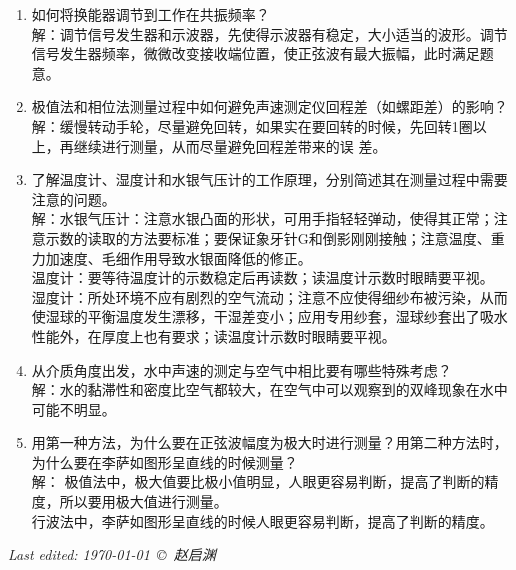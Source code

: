 \documentclass[a4paper,11pt]{article}
\begin{document}
\begin{enumerate}
	\item 如何将换能器调节到工作在共振频率？\\
	解：调节信号发生器和示波器，先使得示波器有稳定，大小适当的波形。调节信号发生器频率，微微改变接收端位置，使正弦波有最大振幅，此时满足题意。
	\item 极值法和相位法测量过程中如何避免声速测定仪回程差（如螺距差）的影响？\\
	解：缓慢转动手轮，尽量避免回转，如果实在要回转的时候，先回转1圈以上，再继续进行测量，从而尽量避免回程差带来的误
	差。
	\item 了解温度计、湿度计和水银气压计的工作原理，分别简述其在测量过程中需要注意的问题。\\
	解：水银气压计：注意水银凸面的形状，可用手指轻轻弹动，使得其正常；注意示数的读取的方法要标准；要保证象牙针G和倒影刚刚接触；注意温度、重力加速度、毛细作用导致水银面降低的修正。\\
	温度计：要等待温度计的示数稳定后再读数；读温度计示数时眼睛要平视。\\
	湿度计：所处环境不应有剧烈的空气流动；注意不应使得细纱布被污染，从而使湿球的平衡温度发生漂移，干湿差变小；应用专用纱套，湿球纱套出了吸水性能外，在厚度上也有要求；读温度计示数时眼睛要平视。
	\item 从介质角度出发，水中声速的测定与空气中相比要有哪些特殊考虑？\\
	解：水的黏滞性和密度比空气都较大，在空气中可以观察到的双峰现象在水中可能不明显。 
	\item 用第一种方法，为什么要在正弦波幅度为极大时进行测量？用第二种方法时，为什么要在李萨如图形呈直线的时候测量？\\
	解： 极值法中，极大值要比极小值明显，人眼更容易判断，提高了判断的精度，所以要用极大值进行测量。\\
	行波法中，李萨如图形呈直线的时候人眼更容易判断，提高了判断的精度。  
\end{enumerate}



	\vfill\noindent\itshape\footnotesize
	\hfill Last edited: \today\ \copyright\ 赵启渊
\end{document}
